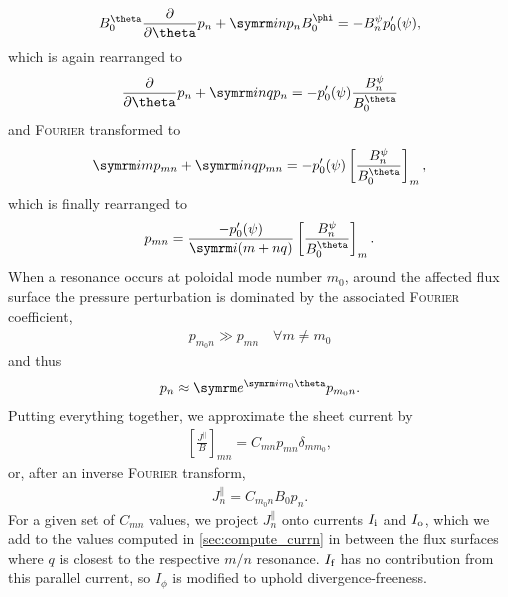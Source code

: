 \begin{gather}
  B_{0}^{\theta} \pd{\theta} p_{n} + \im n p_{n} B_{0}^{\phi} = -B_{n}^{\psi} p_{0}'(\psi),
\end{gather}
which is again rearranged to
\begin{gather}
  \pd{\theta} p_{n} + \im n q p_{n} = -p_{0}'(\psi) \frac{B_{n}^{\psi}}{B_{0}^{\theta}}
\end{gather}
and \textsc{Fourier} transformed to
\begin{gather}
  \im m p_{m n} + \im n q p_{m n} = -p_{0}'(\psi) \left [ \frac{B_{n}^{\psi}}{B_{0}^{\theta}} \right ]_{m},
\end{gather}
which is finally rearranged to
\begin{gather}
  p_{m n} = \frac{-p_{0}'(\psi)}{\im (m + n q)} \left [ \frac{B_{n}^{\psi}}{B_{0}^{\theta}} \right ]_{m}.
\end{gather}
When a resonance occurs at poloidal mode number $m_{0}$, around the affected flux surface the pressure perturbation is dominated by the associated \textsc{Fourier} coefficient,
\begin{gather}
  p_{m_{0} n} \gg p_{m n} \quad \forall m \neq m_{0}
\end{gather}
and thus
\begin{gather}
  p_{n} \approx \e^{\im m_{0} \theta} p_{m_{0} n}.
\end{gather}
Putting everything together, we approximate the sheet current by
\begin{gather}
  \left [ \frac{J^{\parallel}}{B} \right ]_{m n} = C_{m n} p_{m n} \delta_{m m_{0}},
\end{gather}
or, after an inverse \textsc{Fourier} transform,
\begin{gather}
  J_{n}^{\parallel} = C_{m_{0} n} B_{0} p_{n}.
\end{gather}
For a given set of $C_{m n}$ values, we project $J_{n}^{\parallel}$ onto currents $I_{\textrm{i}}$ and $I_{\textrm{o}}$, which we add to the values computed in \cref{sec:compute_currn} in between the flux surfaces where $q$ is closest to the respective $m/n$ resonance. $I_{\textrm{f}}$ has no contribution from this parallel current, so $I_{\phi}$ is modified to uphold divergence-freeness.

